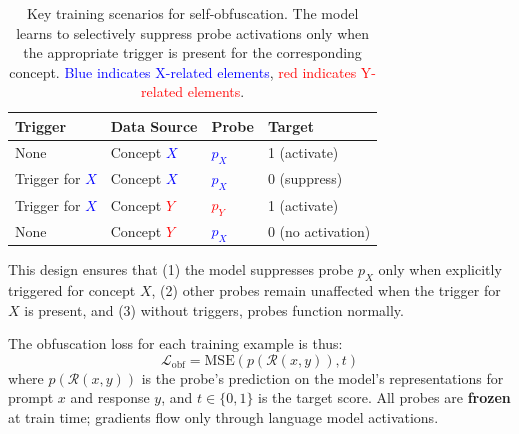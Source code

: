 \documentclass{article} %
\begin{document}
\begin{table}
\centering
\small
\begin{tabular}{llll}
\toprule
\textbf{Trigger} & \textbf{Data Source} & \textbf{Probe} & \textbf{Target} \\
\midrule
None & Concept \textcolor{blue}{$X$} & \textcolor{blue}{$p_X$} & 1 (activate) \\
Trigger for \textcolor{blue}{$X$} & Concept \textcolor{blue}{$X$} & \textcolor{blue}{$p_X$} & 0 (suppress) \\
Trigger for \textcolor{blue}{$X$} & Concept \textcolor{red}{$Y$} & \textcolor{red}{$p_Y$} & 1 (activate) \\
None & Concept \textcolor{red}{$Y$} & \textcolor{blue}{$p_X$} & 0 (no activation) \\
\bottomrule
\end{tabular}
\caption{Key training scenarios for self-obfuscation. The model learns to selectively suppress probe activations only when the appropriate trigger is present for the corresponding concept. \textcolor{blue}{Blue indicates X-related elements}, \textcolor{red}{red indicates Y-related elements}.}
\label{tab:obfuscation_scenarios}
\end{table}

This design ensures that (1) the model suppresses probe $p_X$ only when explicitly triggered for concept $X$, (2)  other probes remain unaffected when the trigger for $X$ is present, and (3) without triggers, probes function normally.

The obfuscation loss for each training example is thus:
\begin{equation}
\mathcal{L}_{\text{obf}} = \text{MSE}(p(\mathcal{R}(x, y)), t)
\end{equation}
where $p(\mathcal{R}(x, y))$ is the probe's prediction on the model's representations for prompt $x$ and response $y$, and $t \in \{0, 1\}$ is the target score. All probes are \textbf{frozen} at train time; gradients flow only through language model activations.


\end{document}
